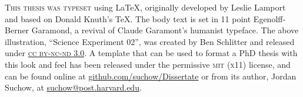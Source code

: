 \newpage


\vspace*{200pt}

\begin{center}

  \parbox{200pt}{\lettrine[lines=3,slope=-2pt,nindent=-4pt]{\textcolor{SchoolColor}{T}}{his
      thesis was typeset} using \LaTeX, originally developed by Leslie Lamport and based
    on
    Donald Knuth's \TeX. The body text is set in 11 point Egenolff-Berner Garamond, a
    revival
    of Claude Garamont's humanist typeface. The above illustration, ``Science Experiment
    02'', was created by Ben Schlitter and released under
    \href{http://creativecommons.org/licenses/by-nc-nd/3.0/}{\textsc{cc by-nc-nd 3.0}}. A
    template that can be used to format a PhD thesis with this look and feel has been
    released under the permissive \textsc{mit} (\textsc{x}11) license, and can be found
    online at \href{https://github.com/suchow/Dissertate}{github.com/suchow/Dissertate}
    or
    from its author, Jordan Suchow, at
    \href{mailto:suchow@post.harvard.edu}{suchow@post.harvard.edu}.}
\end{center}